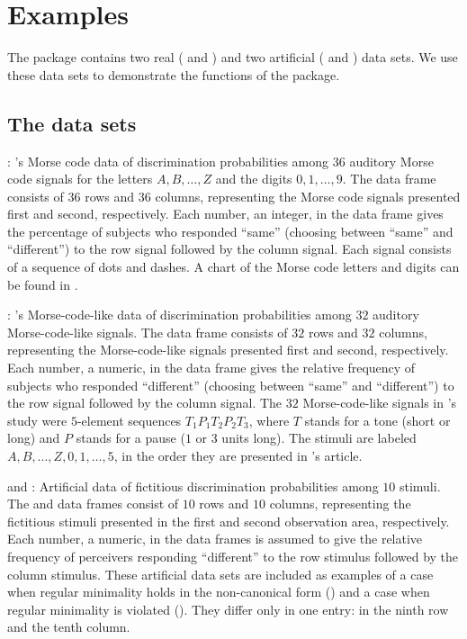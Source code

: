\documentclass[nojss]{jss}
\begin{document}
\section{Examples}
\label{sec:Ex}

The package  contains two real ( and ) and two artificial ( and )
data sets. We use these data sets to demonstrate the functions of the package. 

\subsection{The data sets}

: \cite{Rothk1957}'s Morse code data of discrimination probabilities among $36$ auditory Morse code signals for the letters 
$A, B, \ldots, Z$ and the digits $0, 1, \ldots, 9$. The  data frame consists of $36$ rows and $36$ columns, representing 
the Morse code signals presented first and second, respectively. Each number, 
an integer, in the data frame gives the percentage of subjects who responded
``same'' (choosing between ``same'' and ``different'') to the row signal followed by the column signal. 
Each signal consists of a sequence of dots and dashes. A chart of
the Morse code letters and digits can be found in \cite{Wiki+Morse:2009}.

: \cite{Wish1967}'s Morse-code-like data of discrimination probabilities among $32$ auditory Morse-code-like signals. 
The  data frame consists of $32$ rows and $32$ columns, representing the Morse-code-like signals presented first and second, respectively. 
Each number, a numeric, in the data frame gives the relative frequency of subjects who responded ``different'' (choosing between ``same'' and ``different'') 
to the row signal followed by the column signal. 
The $32$ Morse-code-like signals in \cite{Wish1967}'s study were $5$-element sequences $T_1P_1T_2P_2T_3$, 
where $T$ stands for a tone (short or long) and $P$ stands for a pause ($1$ or $3$ units long). The stimuli are labeled 
$A, B, \ldots, Z, 0, 1, \ldots, 5$, in the order they are presented in \cite{Wish1967}'s article.

 and : Artificial data of fictitious discrimination probabilities among $10$ stimuli. 
The  and  data frames consist of $10$ rows and $10$ columns, representing the fictitious stimuli presented in the first 
and second observation area, respectively.  Each number, a numeric, in the data frames is assumed to give the relative frequency of 
perceivers responding ``different'' to the row stimulus followed by the column stimulus. These artificial data sets are included as examples of a case when regular
minimality holds in the non-canonical form () and a case when regular minimality is violated (). 
They differ only in one entry: in the ninth row and the tenth column.
\end{document}
